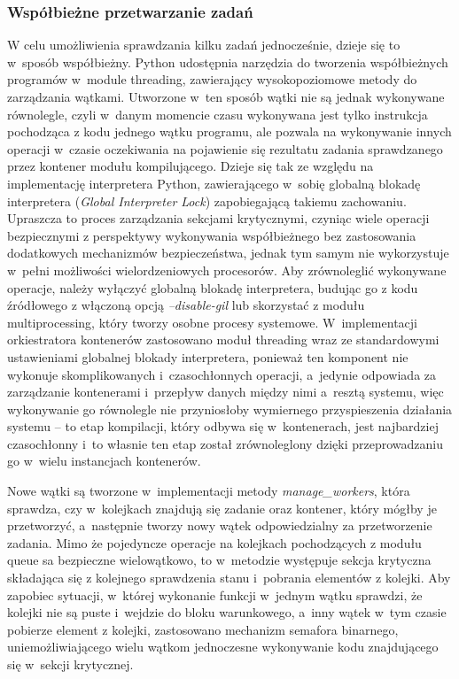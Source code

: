 \subsubsection{Współbieżne przetwarzanie zadań}
W celu umożliwienia sprawdzania kilku zadań jednocześnie, dzieje się to w~sposób współbieżny. Python udostępnia narzędzia do tworzenia współbieżnych programów w~module threading\cite{pythonThreading}, zawierający wysokopoziomowe metody do zarządzania wątkami. Utworzone w~ten sposób wątki nie są jednak wykonywane równolegle, czyli w~danym momencie czasu wykonywana jest tylko instrukcja pochodząca z kodu jednego wątku programu, ale pozwala na wykonywanie innych operacji w~czasie oczekiwania na pojawienie się rezultatu zadania sprawdzanego przez kontener modułu kompilującego. Dzieje się tak ze względu na implementację interpretera Python, zawierającego w~sobię globalną blokadę interpretera (\textit{Global Interpreter Lock}\cite{pythonGlobalInterpreterLock}) zapobiegającą takiemu zachowaniu. Upraszcza to proces zarządzania sekcjami krytycznymi, czyniąc wiele operacji bezpiecznymi z perspektywy wykonywania współbieżnego bez zastosowania dodatkowych mechanizmów bezpieczeństwa, jednak tym samym nie wykorzystuje w~pełni możliwości wielordzeniowych procesorów. Aby zrównoleglić wykonywane operacje, należy wyłączyć globalną blokadę interpretera, budując go z kodu źródłowego z włączoną opcją \textit{--disable-gil} lub skorzystać z modułu multiprocessing\cite{pythonMultiprocessing}, który tworzy osobne procesy systemowe. W~implementacji orkiestratora kontenerów zastosowano moduł threading wraz ze standardowymi ustawieniami globalnej blokady interpretera, ponieważ ten komponent nie wykonuje skomplikowanych i~czasochłonnych operacji, a~jedynie odpowiada za zarządzanie kontenerami i~przepływ danych między nimi a~resztą systemu, więc wykonywanie go równolegle nie przyniosłoby wymiernego przyspieszenia działania systemu -- to etap kompilacji, który odbywa się w~kontenerach, jest najbardziej czasochłonny i~to własnie ten etap został zrównoleglony dzięki przeprowadzaniu go w~wielu instancjach kontenerów.

Nowe wątki są tworzone w~implementacji metody \textit{manage\_workers}, która sprawdza, czy w~kolejkach znajdują się zadanie oraz kontener, który mógłby je przetworzyć, a~następnie tworzy nowy wątek odpowiedzialny za przetworzenie zadania. Mimo że pojedyncze operacje na kolejkach pochodzących z modułu queue\cite{pythonQueue} sa bezpieczne wielowątkowo, to w~metodzie występuje sekcja krytyczna składająca się z kolejnego sprawdzenia stanu i~pobrania elementów z kolejki. Aby zapobiec sytuacji, w~której wykonanie funkcji w~jednym wątku sprawdzi, że kolejki nie są puste i~wejdzie do bloku warunkowego, a~inny wątek w~tym czasie pobierze element z kolejki, zastosowano mechanizm semafora binarnego, uniemożliwiającego wielu wątkom jednoczesne wykonywanie kodu znajdującego się w~sekcji krytycznej.


